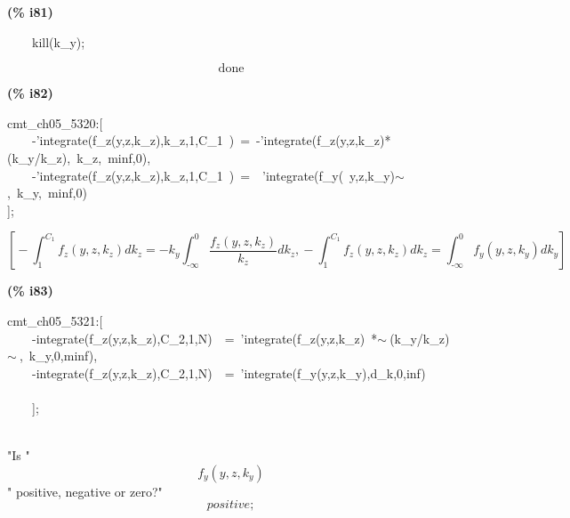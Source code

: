 \documentclass[fleqn]{article}
\begin{document}
\noindent
\begin{minipage}[t]{4.000000em}\color{red}\bfseries
(\% i81)	
\end{minipage}
\begin{minipage}[t]{\textwidth}\color{blue}
\ \ \ \ kill(k\_y);
\end{minipage}
\[\displaystyle \tag{\% o81} 
\ensuremath{\mathrm{done}}\mbox{}
\]


\noindent
\begin{minipage}[t]{4.000000em}\color{red}\bfseries
(\% i82)	
\end{minipage}
\begin{minipage}[t]{\textwidth}\color{blue}
cmt\_ch05\_5320:[\\
\ \ \ \ -'integrate(f\_z(y,z,k\_z),k\_z,1,C\_1\ )\ =\ -'integrate(f\_z(y,z,k\_z)*(k\_y/k\_z),\ k\_z,\ minf,0),\\
\ \ \ \ -'integrate(f\_z(y,z,k\_z),k\_z,1,C\_1\ )\ =\ \ 'integrate(f\_y(\ y,z,k\_y)\ensuremath{\sim\ },\ k\_y,\ minf,0)\\
];
\end{minipage}
\[\displaystyle \tag{\% o82} 
\operatorname{[}-\int_{1}^{{C_1}}{\left. {f_z}\left( y\operatorname{,}z\operatorname{,}{k_z}\right) d{k_z}\right.}=-{k_y} \int_{\operatorname{-}\infty }^{0}{\left. \frac{{f_z}\left( y\operatorname{,}z\operatorname{,}{k_z}\right) }{{k_z}}d{k_z}\right.}\operatorname{,}-\int_{1}^{{C_1}}{\left. {f_z}\left( y\operatorname{,}z\operatorname{,}{k_z}\right) d{k_z}\right.}=
\int_{\operatorname{-}\infty }^{0}{\left. {f_y}\left( y\operatorname{,}z\operatorname{,}{k_y}\right) d{k_y}\right.}\operatorname{]}\mbox{}
\]


\noindent
\begin{minipage}[t]{4.000000em}\color{red}\bfseries
(\% i83)	
\end{minipage}
\begin{minipage}[t]{\textwidth}\color{blue}
cmt\_ch05\_5321:[\\
\ \ \ \ -integrate(f\_z(y,z,k\_z),C\_2,1,N)\ \ =\ 'integrate(f\_z(y,z,k\_z)\ *\ensuremath{\sim\ }(k\_y/k\_z)\ensuremath{\sim\ },\ k\_y,0,minf),\\
\ \ \ \ -integrate(f\_z(y,z,k\_z),C\_2,1,N)\ \ =\ 'integrate(f\_y(y,z,k\_y),d\_k,0,inf)\\
\ \ \ \ \\
\ \ \ \ ];
\end{minipage}
\mbox{}\\"Is "
\[\displaystyle {f_y}\left( y\operatorname{,}z\operatorname{,}{k_y}\right) \mbox{}
\]" positive, negative or zero?"
\[\displaystyle positive;\mbox{}\]
\end{document}
